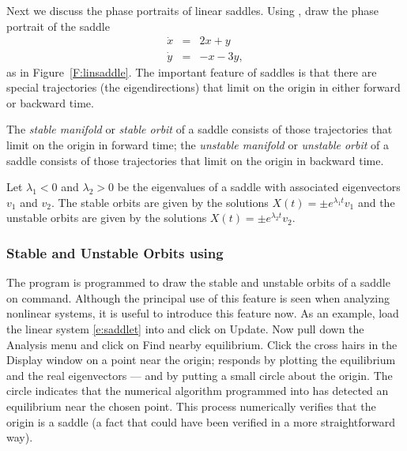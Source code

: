 \documentclass{ximera}
\begin{document}
Next we discuss the phase portraits of linear saddles.  Using
{\pplane}, draw the phase portrait
of the saddle
\begin{equation}  \label{e:saddlet}
\begin{array}{rcl}
\dot{x} & = & 2x+y\\
\dot{y} & = & -x-3y,
\end{array}
\end{equation}
as in Figure~\ref{F:linsaddle}.  The important feature of saddles
is that there are special trajectories (the eigendirections) that
limit on the origin in either forward or backward time.

\begin{figure*}[htb]
           \centerline{%
           }
           \caption{(Left) Saddle phase portrait.
	(Right) First quadrant solution time series.}
           \label{F:linsaddle}
\end{figure*}

\begin{definition} \label{D:stablemfld}
The {\em stable manifold\/} or {\em stable orbit\/} of a saddle consists of
those trajectories that limit on the origin in forward time; the
{\em unstable manifold\/} or {\em unstable orbit\/} of a saddle consists of
those trajectories that limit on the origin in backward time.
\end{definition}
 
 

Let $\lambda_1<0$ and $\lambda_2>0$ be the eigenvalues of a saddle with
associated eigenvectors $v_1$ and $v_2$.  The stable orbits are given by the
solutions $X(t) = \pm e^{\lambda_1 t}v_1$ and the unstable orbits are given
by the solutions $X(t) = \pm e^{\lambda_2 t}v_2$.

\subsubsection*{Stable and Unstable Orbits using {\sf \pplane}}

The program {\pplane} is programmed to draw the stable and unstable
orbits of a saddle on command. Although the principal use of this
feature is seen when analyzing nonlinear systems, it is useful to
introduce this feature now.  As an example, load the linear system
\eqref{e:saddlet} into {\pplane} and click on {\sf Update}.  Now
pull down the {\sf Analysis} menu and click on {\sf Find nearby
equilibrium}.  Click the cross hairs in the {\sf \PPLANE\; Display}
window on a point near the origin; {\pplane} responds by
plotting the equilibrium and the real eigenvectors --- and by putting 
a small circle about the origin.  The circle indicates that the numerical algorithm
programmed into {\pplane} has detected an equilibrium near
the chosen point.  This process numerically verifies that the origin
is a saddle (a fact that could have been verified in a more
straightforward way).
\end{document}
